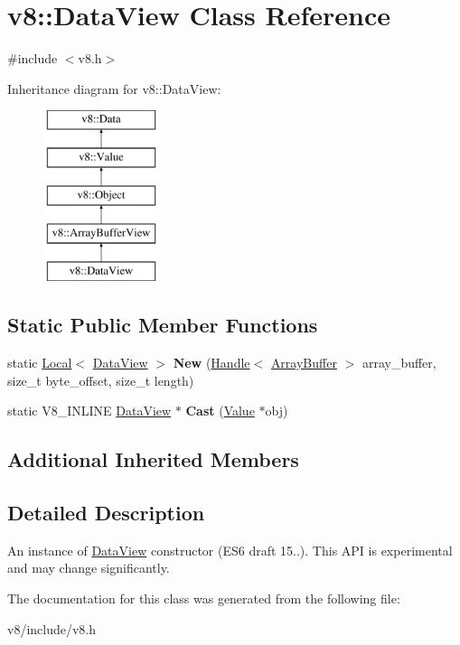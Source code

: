 \hypertarget{classv8_1_1DataView}{\section{v8\-:\-:Data\-View Class Reference}
\label{classv8_1_1DataView}
}


{\ttfamily \#include $<$v8.\-h$>$}

Inheritance diagram for v8\-:\-:Data\-View\-:\begin{figure}[H]
\begin{center}
\leavevmode
\includegraphics[height=5.000000cm]{classv8_1_1DataView}
\end{center}
\end{figure}
\subsection*{Static Public Member Functions}
\begin{DoxyCompactItemize}
\item 
\hypertarget{classv8_1_1DataView_a5157c044dbb50669bc2977ea7482aa32}{static \hyperlink{classv8_1_1Local}{Local}$<$ \hyperlink{classv8_1_1DataView}{Data\-View} $>$ {\bfseries New} (\hyperlink{classv8_1_1Handle}{Handle}$<$ \hyperlink{classv8_1_1ArrayBuffer}{Array\-Buffer} $>$ array\-\_\-buffer, size\-\_\-t byte\-\_\-offset, size\-\_\-t length)}\label{classv8_1_1DataView_a5157c044dbb50669bc2977ea7482aa32}

\item 
\hypertarget{classv8_1_1DataView_aa97d15fcb28c6c002a52d32877c8fd3a}{static V8\-\_\-\-I\-N\-L\-I\-N\-E \hyperlink{classv8_1_1DataView}{Data\-View} $\ast$ {\bfseries Cast} (\hyperlink{classv8_1_1Value}{Value} $\ast$obj)}\label{classv8_1_1DataView_aa97d15fcb28c6c002a52d32877c8fd3a}

\end{DoxyCompactItemize}
\subsection*{Additional Inherited Members}


\subsection{Detailed Description}
An instance of \hyperlink{classv8_1_1DataView}{Data\-View} constructor (E\-S6 draft 15..). This A\-P\-I is experimental and may change significantly. 

The documentation for this class was generated from the following file\-:\begin{DoxyCompactItemize}
\item 
v8/include/v8.\-h\end{DoxyCompactItemize}
